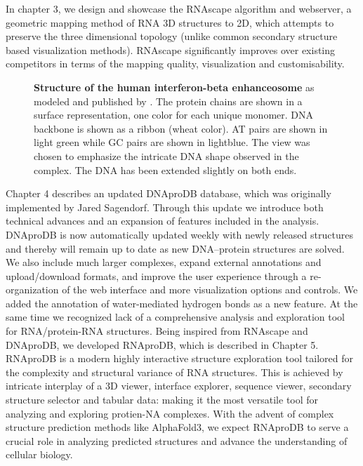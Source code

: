 In chapter 3, we design and showcase the RNAscape algorithm and webserver, a geometric mapping method of RNA 3D structures to 2D, which attempts to preserve the three dimensional topology (unlike common secondary structure based visualization methods). RNAscape significantly improves over existing competitors in terms of the mapping quality, visualization and customisability.
\begin{center}
    \begin{figure}[H]
        \caption[Structure of the human interferon-beta enhanceosome]{\textbf{ Structure of the human interferon-beta enhanceosome} as modeled and published by \citet{panne2007atomic}. The protein chains are shown in a surface representation, one color for each unique monomer. DNA backbone is shown as a ribbon (wheat color). AT pairs are shown in light green while GC pairs are shown in lightblue. The view was chosen to emphasize the intricate DNA shape observed in the complex. The DNA has been extended slightly on both ends.}
  \label{fig:mmc2}
\end{figure}
\end{center}
Chapter 4 describes an updated DNAproDB database, which was originally implemented by Jared Sagendorf. Through this update we
introduce both technical advances and an expansion of features included in the analysis.
DNAproDB is now automatically updated weekly with newly released structures and thereby will
remain up to date as new DNA–protein structures are solved. We also include much larger
complexes, expand external annotations and upload/download formats, and improve the user
experience through a re-organization of the web interface and more visualization options and
controls. We added the annotation of water-mediated hydrogen bonds as a new feature.
At the same time we recognized lack of a comprehensive analysis and exploration tool for RNA/protein-RNA structures. Being inspired from RNAscape and DNAproDB, we developed RNAproDB, which is described in Chapter 5. RNAproDB is a modern highly interactive structure exploration tool tailored for the complexity and structural variance of RNA structures. This is achieved by intricate interplay of a 3D viewer, interface explorer, sequence viewer, secondary structure selector and tabular data:  making it the most versatile tool for analyzing and exploring protien-NA complexes. With the advent of complex structure prediction methods like AlphaFold3, we expect RNAproDB to serve a crucial role in analyzing predicted structures and advance the understanding of cellular biology.
